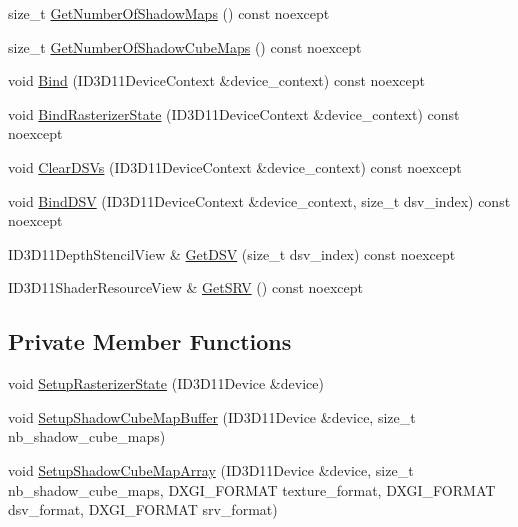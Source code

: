 \begin{DoxyCompactItemize}
\item 
size\+\_\+t \mbox{\hyperlink{classmage_1_1rendering_1_1_shadow_cube_map_buffer_a491b9a0306748de68b2cb391e572cb7d}{Get\+Number\+Of\+Shadow\+Maps}} () const noexcept
\item 
size\+\_\+t \mbox{\hyperlink{classmage_1_1rendering_1_1_shadow_cube_map_buffer_a6641e56d3f586ab2cdc74d26b8877168}{Get\+Number\+Of\+Shadow\+Cube\+Maps}} () const noexcept
\item 
void \mbox{\hyperlink{classmage_1_1rendering_1_1_shadow_cube_map_buffer_a584f753f82c2378a8c7171bdf5a96999}{Bind}} (I\+D3\+D11\+Device\+Context \&device\+\_\+context) const noexcept
\item 
void \mbox{\hyperlink{classmage_1_1rendering_1_1_shadow_cube_map_buffer_aa206227920ac298eb4dcfdc8e662663d}{Bind\+Rasterizer\+State}} (I\+D3\+D11\+Device\+Context \&device\+\_\+context) const noexcept
\item 
void \mbox{\hyperlink{classmage_1_1rendering_1_1_shadow_cube_map_buffer_a31df46f6fe89cbaedb7f256ab7ecf514}{Clear\+D\+S\+Vs}} (I\+D3\+D11\+Device\+Context \&device\+\_\+context) const noexcept
\item 
void \mbox{\hyperlink{classmage_1_1rendering_1_1_shadow_cube_map_buffer_ad64e3c0b0c537e4e3f6b301fefb5c60a}{Bind\+D\+SV}} (I\+D3\+D11\+Device\+Context \&device\+\_\+context, size\+\_\+t dsv\+\_\+index) const noexcept
\item 
I\+D3\+D11\+Depth\+Stencil\+View \& \mbox{\hyperlink{classmage_1_1rendering_1_1_shadow_cube_map_buffer_af0727a4cabdd9d362bf97ca638c578b2}{Get\+D\+SV}} (size\+\_\+t dsv\+\_\+index) const noexcept
\item 
I\+D3\+D11\+Shader\+Resource\+View \& \mbox{\hyperlink{classmage_1_1rendering_1_1_shadow_cube_map_buffer_af373185fc99b3c2f736e9a397436951a}{Get\+S\+RV}} () const noexcept
\end{DoxyCompactItemize}
\subsection*{Private Member Functions}
\begin{DoxyCompactItemize}
\item 
void \mbox{\hyperlink{classmage_1_1rendering_1_1_shadow_cube_map_buffer_a65d31b9a335e6c27c8d4d6e0127029b2}{Setup\+Rasterizer\+State}} (I\+D3\+D11\+Device \&device)
\item 
void \mbox{\hyperlink{classmage_1_1rendering_1_1_shadow_cube_map_buffer_a4b6e895628905a9ddbaccfafb6a1d5b6}{Setup\+Shadow\+Cube\+Map\+Buffer}} (I\+D3\+D11\+Device \&device, size\+\_\+t nb\+\_\+shadow\+\_\+cube\+\_\+maps)
\item 
void \mbox{\hyperlink{classmage_1_1rendering_1_1_shadow_cube_map_buffer_ac800b8fde94ee7527ce09370b4f9e44a}{Setup\+Shadow\+Cube\+Map\+Array}} (I\+D3\+D11\+Device \&device, size\+\_\+t nb\+\_\+shadow\+\_\+cube\+\_\+maps, D\+X\+G\+I\+\_\+\+F\+O\+R\+M\+AT texture\+\_\+format, D\+X\+G\+I\+\_\+\+F\+O\+R\+M\+AT dsv\+\_\+format, D\+X\+G\+I\+\_\+\+F\+O\+R\+M\+AT srv\+\_\+format)
\end{DoxyCompactItemize}
